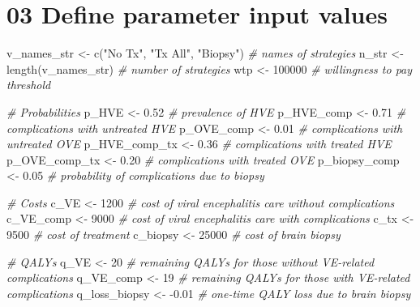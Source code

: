 \documentclass[
]{article}
\newenvironment{Shaded}{\begin{snugshade}}{\end{snugshade}}
\newcommand{\CommentTok}[1]{\textcolor[rgb]{0.56,0.35,0.01}{\textit{#1}}}
\newcommand{\DecValTok}[1]{\textcolor[rgb]{0.00,0.00,0.81}{#1}}
\newcommand{\FloatTok}[1]{\textcolor[rgb]{0.00,0.00,0.81}{#1}}
\newcommand{\FunctionTok}[1]{\textcolor[rgb]{0.00,0.00,0.00}{#1}}
\newcommand{\NormalTok}[1]{#1}
\newcommand{\OtherTok}[1]{\textcolor[rgb]{0.56,0.35,0.01}{#1}}
\newcommand{\SpecialCharTok}[1]{\textcolor[rgb]{0.00,0.00,0.00}{#1}}
\newcommand{\StringTok}[1]{\textcolor[rgb]{0.31,0.60,0.02}{#1}}
\begin{document}
\hypertarget{define-parameter-input-values}{%
\section{03 Define parameter input
values}\label{define-parameter-input-values}}

\begin{Shaded}
\begin{Highlighting}[]
\NormalTok{v\_names\_str }\OtherTok{\textless{}{-}} \FunctionTok{c}\NormalTok{(}\StringTok{"No Tx"}\NormalTok{, }\StringTok{"Tx All"}\NormalTok{, }\StringTok{"Biopsy"}\NormalTok{) }\CommentTok{\# names of strategies}
\NormalTok{n\_str       }\OtherTok{\textless{}{-}} \FunctionTok{length}\NormalTok{(v\_names\_str)            }\CommentTok{\# number of strategies}
\NormalTok{wtp         }\OtherTok{\textless{}{-}} \DecValTok{100000}                         \CommentTok{\# willingness to pay threshold}

\CommentTok{\# Probabilities}
\NormalTok{p\_HVE         }\OtherTok{\textless{}{-}} \FloatTok{0.52} \CommentTok{\# prevalence of HVE}
\NormalTok{p\_HVE\_comp    }\OtherTok{\textless{}{-}} \FloatTok{0.71} \CommentTok{\# complications with untreated HVE}
\NormalTok{p\_OVE\_comp    }\OtherTok{\textless{}{-}} \FloatTok{0.01} \CommentTok{\# complications with untreated OVE}
\NormalTok{p\_HVE\_comp\_tx }\OtherTok{\textless{}{-}} \FloatTok{0.36} \CommentTok{\# complications with treated HVE}
\NormalTok{p\_OVE\_comp\_tx }\OtherTok{\textless{}{-}} \FloatTok{0.20} \CommentTok{\# complications with treated OVE}
\NormalTok{p\_biopsy\_comp }\OtherTok{\textless{}{-}} \FloatTok{0.05} \CommentTok{\# probability of complications due to biopsy}

\CommentTok{\# Costs}
\NormalTok{c\_VE      }\OtherTok{\textless{}{-}} \DecValTok{1200}  \CommentTok{\# cost of viral encephalitis care without complications}
\NormalTok{c\_VE\_comp }\OtherTok{\textless{}{-}} \DecValTok{9000}  \CommentTok{\# cost of viral encephalitis care with complications}
\NormalTok{c\_tx      }\OtherTok{\textless{}{-}} \DecValTok{9500}  \CommentTok{\# cost of treatment}
\NormalTok{c\_biopsy  }\OtherTok{\textless{}{-}} \DecValTok{25000} \CommentTok{\# cost of brain biopsy}

\CommentTok{\# QALYs}
\NormalTok{q\_VE          }\OtherTok{\textless{}{-}} \DecValTok{20}    \CommentTok{\# remaining QALYs for those without VE{-}related complications}
\NormalTok{q\_VE\_comp     }\OtherTok{\textless{}{-}} \DecValTok{19}    \CommentTok{\# remaining QALYs for those with VE{-}related complications}
\NormalTok{q\_loss\_biopsy }\OtherTok{\textless{}{-}} \SpecialCharTok{{-}}\FloatTok{0.01} \CommentTok{\# one{-}time QALY loss due to brain biopsy}


\end{Highlighting}
\end{Shaded}
\end{document}

